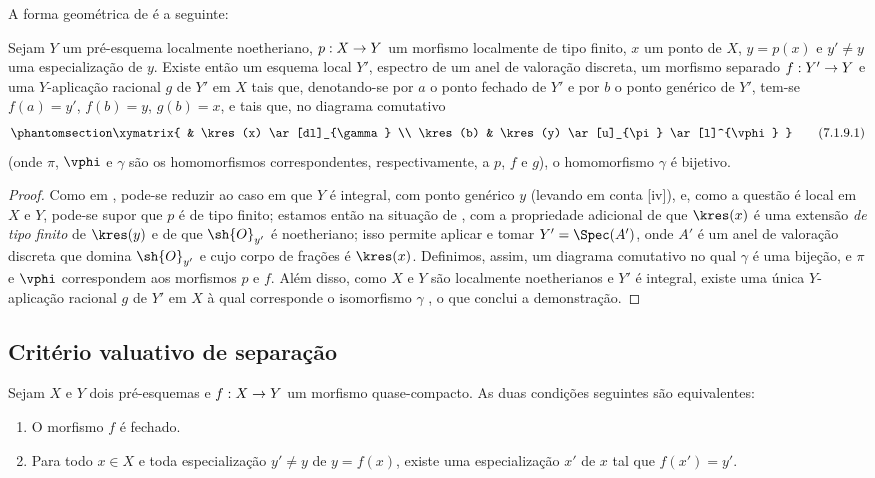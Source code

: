 \documentclass[oneside,10pt]{amsart}
\makeatletter
\newcommand{\ega@arrow}[2]{\mathchoice{#1}{#2}{#2}{#2}}
\renewcommand{\to}{\ega@arrow{\longrightarrow}{\rightarrow}}
\newcommand{\oldpage}[2][]{\marginnote{\normalfont\footnotesize\textbf{#1}~|~#2}\ignorespaces}
\let\EGAOriginalLabel\label
\renewcommand{\label}[1]{\phantomsection\EGAOriginalLabel{#1}}
\makeatother
\begin{document}
A forma geométrica de  é a seguinte:
\oldpage[II]{141}
\begin{proposition}[7.1.9]
\label{II.7.1.9}
Sejam $Y$ um pré-esquema localmente noetheriano, $p:X\to Y$ um morfismo localmente de tipo finito, $x$ um ponto de $X$, $y=p(x)$ e $y'\neq y$ uma especialização de $y$.
Existe então um esquema local $Y'$, espectro de um anel de valoração discreta, um morfismo separado $f:Y'\to Y$ e uma $Y$-aplicação racional $g$ de $Y'$ em $X$ tais que, denotando-se por $a$ o ponto fechado de $Y'$ e por $b$ o ponto genérico de $Y'$, tem-se $f(a)=y'$, $f(b)=y$, $g(b)=x$, e tais que, no diagrama comutativo
\[
\label{II.7.1.9.1}
    \xymatrix{
        & \kres(x) \ar[dl]_{\gamma}
    \\  \kres(b)
        & \kres(y) \ar[u]_{\pi} \ar[l]^{\vphi}
    }
\tag{7.1.9.1}
\]
(onde $\pi$, $\vphi$ e $\gamma$ são os homomorfismos correspondentes, respectivamente, a $p$, $f$ e $g$), o homomorfismo $\gamma$ é bijetivo.
\end{proposition}

\begin{proof}
Como em , pode-se reduzir ao caso em que $Y$ é integral, com ponto genérico $y$ (levando em conta [iv]), e, como a questão é local em $X$ e $Y$, pode-se supor que $p$ é de tipo finito;
estamos então na situação de , com a propriedade adicional de que $\kres(x)$ é uma extensão \emph{de tipo finito} de $\kres(y)$  e de que $\sh{O}_{y'}$ é noetheriano;
isso permite aplicar  e tomar $Y'=\Spec(A')$, onde $A'$ é um anel de valoração discreta que domina $\sh{O}_{y'}$ e cujo corpo de frações é $\kres(x)$.
Definimos, assim, um diagrama comutativo  no qual $\gamma$ é uma bijeção, e $\pi$ e $\vphi$ correspondem aos morfismos $p$ e $f$.
Além disso, como $X$ e $Y$ são localmente noetherianos  e $Y'$ é integral, existe uma única $Y$-aplicação racional $g$ de $Y'$ em $X$ à qual corresponde o isomorfismo $\gamma$ , o que conclui a demonstração.
\end{proof}

\subsection{Critério valuativo de separação}
\label{subsection:II.7.2}

\begin{proposition}[7.2.1]
\label{II.7.2.1}
Sejam $X$ e $Y$ dois pré-esquemas e $f:X\to Y$ um morfismo quase-compacto.
As duas condições seguintes são equivalentes:
\begin{enumerate}
    \item[\rm{(a)}] O morfismo $f$ é fechado.
    \item[\rm{(b)}] Para todo $x\in X$ e toda especialização $y'\neq y$ de $y=f(x)$, existe uma especialização $x'$ de $x$ tal que $f(x')=y'$.
\end{enumerate}
\end{proposition}
\end{document}
